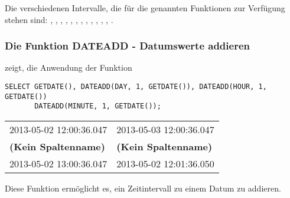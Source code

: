         \begin{merke}
          Die verschiedenen Intervalle, die für die genannten Funktionen zur
          Verfügung stehen sind: ,
          ,  ,
          , , ,
          , , ,
          , , ,
          .
        \end{merke}
		\clearpage
        \subsubsection{Die Funktion DATEADD - Datumswerte addieren}
           zeigt, die Anwendung der Funktion 
          \begin{lstlisting}[language=ms_sql,caption={Die Funktion \languagemssql{DATEADD} in SQL Server},label=sql03_22]
SELECT GETDATE(), DATEADD(DAY, 1, GETDATE()), DATEADD(HOUR, 1, GETDATE())
       DATEADD(MINUTE, 1, GETDATE());
          \end{lstlisting}
          \begin{center}
            \begin{small}
              \tabletail{}
              \tablelasttail{}
              \begin{mssql}
                \begin{supertabular}{ll}
                  2013-05-02 12:00:36.047 & 2013-05-03 12:00:36.047 \\
                  \textbf{(Kein Spaltenname)} & \textbf{(Kein Spaltenname)} \\
                  \cmidrule(l){1-1}\cmidrule(l){2-2}
                  2013-05-02 13:00:36.047 & 2013-05-02 12:01:36.050 \\
                \end{supertabular}
              \end{mssql}
            \end{small}
          \end{center}
          Diese Funktion ermöglicht es, ein Zeitintervall zu einem Datum zu addieren.
